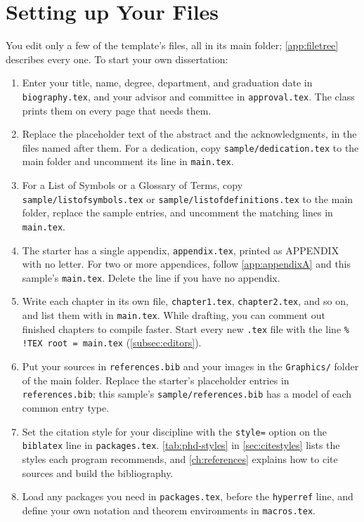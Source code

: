\section{Setting up Your Files}
\label{sec:setup}

You edit only a few of the template's files, all in its main folder; \cref{app:filetree} describes every one. To start your own dissertation:
\begin{enumerate}
\item Enter your title, name, degree, department, and graduation date in \texttt{biography.tex}, and your advisor and committee in \texttt{approval.tex}. The class prints them on every page that needs them.
\item Replace the placeholder text of the abstract and the acknowledgments, in the files named after them. For a dedication, copy \texttt{sample/dedication.tex} to the main folder and uncomment its line in \texttt{main.tex}.
\item For a List of Symbols or a Glossary of Terms, copy \texttt{sample/listofsymbols.tex} or \texttt{sample/listofdefinitions.tex} to the main folder, replace the sample entries, and uncomment the matching lines in \texttt{main.tex}.
\item The starter has a single appendix, \texttt{appendix.tex}, printed as APPENDIX with no letter. For two or more appendices, follow \cref{app:appendixA} and this sample's \texttt{main.tex}. Delete the \verb++ line if you have no appendix.
\item Write each chapter in its own file, \texttt{chapter1.tex}, \texttt{chapter2.tex}, and so on, and list them with \verb++ in \texttt{main.tex}. While drafting, you can comment out finished chapters to compile faster. Start every new \texttt{.tex} file with the line \verb+% !TEX root = main.tex+ (\cref{subsec:editors}).
\item Put your sources in \texttt{references.bib} and your images in the \texttt{Graphics/} folder of the main folder. Replace the starter's placeholder entries in \texttt{references.bib}; this sample's \texttt{sample/references.bib} has a model of each common entry type.
\item Set the citation style for your discipline with the \texttt{style=} option on the \texttt{biblatex} line in \texttt{packages.tex}. \cref{tab:phd-styles} in \cref{sec:citestyles} lists the styles each program recommends, and \cref{ch:references} explains how to cite sources and build the bibliography.
\item Load any packages you need in \texttt{packages.tex}, before the \texttt{hyperref} line, and define your own notation and theorem environments in \texttt{macros.tex}.
\end{enumerate}
